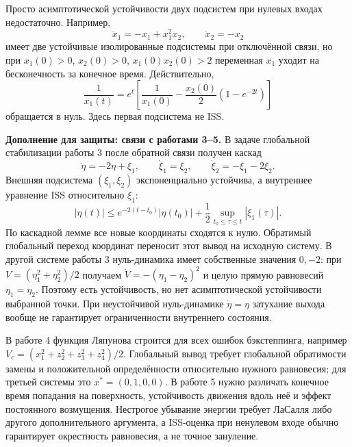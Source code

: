 Просто асимптотической устойчивости двух подсистем при нулевых
входах недостаточно. Например,
\[
 \dot x_1=-x_1+x_1^2x_2,\qquad \dot x_2=-x_2
\]
имеет две устойчивые изолированные подсистемы при отключённой
связи, но при $x_1(0)>0$, $x_2(0)>0$,
$x_1(0)x_2(0)>2$ переменная $x_1$ уходит на бесконечность
за конечное время. Действительно,
\[
 \frac1{x_1(t)}=e^t\left[
 \frac1{x_1(0)}-\frac{x_2(0)}2(1-e^{-2t})\right]
\]
обращается в нуль. Здесь первая подсистема не ISS.

\textbf{Дополнение для защиты: связи с работами 3--5.}
В задаче глобальной стабилизации работы 3 после обратной связи
получен каскад
\[
 \dot\eta=-2\eta+\xi_1,\qquad
 \dot\xi_1=\xi_2,\qquad \dot\xi_2=-\xi_1-2\xi_2.
\]
Внешняя подсистема $(\xi_1,\xi_2)$ экспоненциально устойчива,
а внутреннее уравнение ISS относительно $\xi_1$:
\[
 |\eta(t)|\le e^{-2(t-t_0)}|\eta(t_0)|
 +\frac12\sup_{t_0\le\tau\le t}|\xi_1(\tau)|.
\]
По каскадной лемме все новые координаты сходятся к нулю.
Обратимый глобальный переход координат переносит этот вывод
на исходную систему.
В другой системе работы 3 нуль-динамика имеет собственные
значения $0,-2$: при
$V=(\eta_1^2+\eta_2^2)/2$ получаем
$\dot V=-(\eta_1-\eta_2)^2$ и целую прямую равновесий
$\eta_1=\eta_2$. Поэтому есть устойчивость, но нет
асимптотической устойчивости выбранной точки.
При неустойчивой нуль-динамике $\dot\eta=\eta$ затухание выхода
вообще не гарантирует ограниченности внутреннего состояния.

В работе 4 функция Ляпунова строится для всех ошибок
бэкстеппинга, например
$V_c=(x_1^2+z_2^2+z_3^2+z_4^2)/2$.
Глобальный вывод требует глобальной обратимости замены
и положительной определённости относительно нужного равновесия;
для третьей системы это $x^*=(0,1,0,0)$.
В работе 5 нужно различать конечное время попадания на поверхность,
устойчивость движения вдоль неё и эффект постоянного возмущения.
Нестрогое убывание энергии требует ЛаСалля либо другого
дополнительного аргумента, а ISS-оценка при ненулевом входе
обычно гарантирует окрестность равновесия, а не точное зануление.
